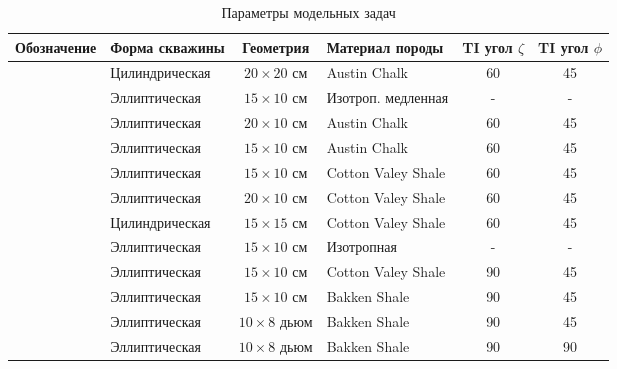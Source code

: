 \begin{table}
\footnotesize
\centering
\caption{Параметры модельных задач}
\renewcommand{\arraystretch}{1.5}
\begin{tabularx}{\textwidth}{|C|l|c|l|c|c|}
\hline  Обозначение & Форма скважины & Геометрия & Материал породы & TI угол $\zeta$ & TI угол $\phi$ \\ \hline
\hline \textbf{}\modelnum{\label{mnum: 1}}& Цилиндрическая & $20 \times 20$ см & Austin Chalk & 60 & 45 \\ 
\hline \textbf{}\modelnum{\label{mnum: 2}}& Эллиптическая & $15 \times 10$ см & Изотроп. медленная & - & - \\ 
\hline \textbf{}\modelnum{\label{mnum: 3}}& Эллиптическая & $20 \times 10$ см & Austin Chalk & 60 & 45 \\ 
\hline \textbf{}\modelnum{\label{mnum: 4}}& Эллиптическая & $15 \times 10$ см & Austin Chalk & 60 & 45 \\ 
\hline \textbf{}\modelnum{\label{mnum: 5}}& Эллиптическая & $15 \times 10$ см & Cotton Valey Shale & 60 & 45 \\ 
\hline \textbf{}\modelnum{\label{mnum: 6}}& Эллиптическая & $20 \times 10$ см & Cotton Valey Shale & 60 & 45 \\ 
\hline \textbf{}\modelnum{\label{mnum: 7}}& Цилиндрическая & $15 \times 15$ см & Cotton Valey Shale & 60 & 45 \\ 
\hline \textbf{}\modelnum{\label{mnum: 8}}& Эллиптическая & $15 \times 10$ см & Изотропная & - & - \\ 
\hline \textbf{}\modelnum{\label{mnum: 9}}& Эллиптическая & $15 \times 10$ см & Cotton Valey Shale & 90 & 45 \\
\hline \textbf{}\modelnum{\label{mnum: 10}}& Эллиптическая & $15 \times 10$ см & Bakken Shale & 90 & 45 \\
\hline \textbf{}\modelnum{\label{mnum: 11}}& Эллиптическая & $10 \times 8$ дьюм & Bakken Shale & 90 & 45 \\
\hline \textbf{}\modelnum{\label{mnum: 12}}& Эллиптическая & $10 \times 8$ дьюм & Bakken Shale & 90 & 90 \\
\hline 
\end{tabularx}
\renewcommand{\arraystretch}{1.0}
\end{table}